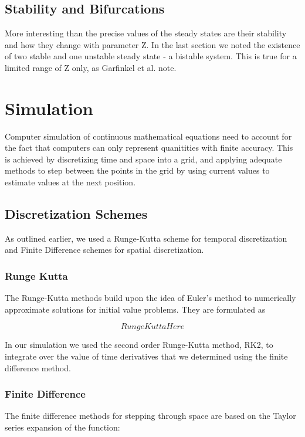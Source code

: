 \documentclass[12pt]{article}
\begin{document}
  \subsection{Stability and Bifurcations}
  
  More interesting than the precise values of the steady states are their stability and how they change with parameter Z. In the last section we noted the existence of two stable and one unstable steady state - a bistable system. This is true for a limited range of Z only, as Garfinkel et al. note.
  
  
 \section{Simulation}
 Computer simulation of continuous mathematical equations need to account for the fact that computers can only represent quanitities with finite accuracy. This is achieved by discretizing time and space into a grid, and applying adequate methods to step between the points in the grid by using current values to estimate values at the next position.
 
 \subsection{Discretization Schemes}
 
 As outlined earlier, we used a Runge-Kutta scheme for temporal discretization and Finite Difference schemes for spatial discretization.
 
 \subsubsection*{Runge Kutta}
 
 The Runge-Kutta methods build upon the idea of Euler's method to numerically approximate solutions for initial value problems. They are formulated as
 
 $$Runge Kutta Here$$
 
 In our simulation we used the second order Runge-Kutta method, RK2, to integrate over the value of time derivatives that we determined using the finite difference method.
 
 \subsubsection*{Finite Difference}
 The finite difference methods for stepping through space are based on the Taylor series expansion of the function:
 
\end{document}

